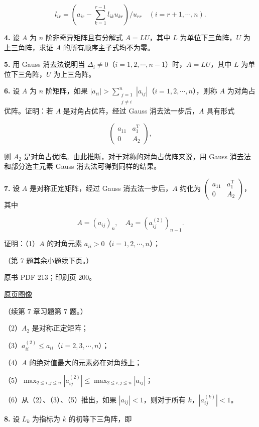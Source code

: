\documentclass[
  10pt,
  fontset=fandol]{ctexart}
\begin{document}
\[
l_{ir}=\left(a_{ir}-\sum_{k=1}^{r-1}l_{ik}u_{kr}\right)/u_{rr}\quad(i=r+1,\cdots,n).
\]

\textbf{4.} 设 \(A\) 为 \(n\) 阶非奇异矩阵且有分解式 \(A=LU\)，其中
\(L\) 为单位下三角阵，\(U\) 为上三角阵，求证 \(A\)
的所有顺序主子式均不为零。

\textbf{5.} 用 Gauss 消去法说明当
\(\Delta_i\neq0\)（\(i=1,2,\cdots,n-1\)）时，\(A=LU\)，其中 \(L\)
为单位下三角阵，\(U\) 为上三角阵。

\textbf{6.} 设 \(A\) 为 \(n\) 阶矩阵，如果
\(|a_{ii}|>\sum_{\substack{j=1\\j\neq i}}^{n}|a_{ij}|\)（\(i=1,2,\cdots,n\)），则称
\(A\) 为对角占优阵。证明：若 \(A\) 是对角占优阵，经过 Gauss
消去法一步后，\(A\) 具有形式

\[
\begin{pmatrix}a_{11}&a_1^{\mathrm T}\\0&A_2\end{pmatrix},
\]

则 \(A_2\) 是对角占优阵。由此推断，对于对称的对角占优阵来说，用 Gauss
消去法和部分选主元素 Gauss 消去法可得到同样的结果。

\textbf{7.} 设 \(A\) 是对称正定矩阵，经过 Gauss 消去法一步后，\(A\)
约化为
\(\begin{pmatrix}a_{11}&a_1^{\mathrm T}\\0&A_2\end{pmatrix}\)，其中

\[
A=(a_{ij})_n,\quad A_2=(a_{ij}^{(2)})_{n-1}.
\]

证明：（1）\(A\) 的对角元素 \(a_{ii}>0\)（\(i=1,2,\cdots,n\)）；

（第 7 题其余小题续下页。）

\clearpage

原书 PDF 213；印刷页 200。

\href{../../../source-images/pdf-213.jpeg}{原页图像}

（续第 7 章习题第 7 题。）

（2）\(A_2\) 是对称正定矩阵；

（3）\(a_{ii}^{(2)}\leqslant a_{ii}\)（\(i=2,3,\cdots,n\)）；

（4）\(A\) 的绝对值最大的元素必在对角线上；

（5）\(\max_{2\leqslant i,j\leqslant n}|a_{ij}^{(2)}|\leqslant\max_{2\leqslant i,j\leqslant n}|a_{ij}|\)；

（6）从（2）、（3）、（5）推出，如果 \(|a_{ij}|<1\)，则对于所有
\(k\)，\(|a_{ij}^{(k)}|<1\)。

\textbf{8.} 设 \(L_k\) 为指标为 \(k\) 的初等下三角阵，即
\end{document}
